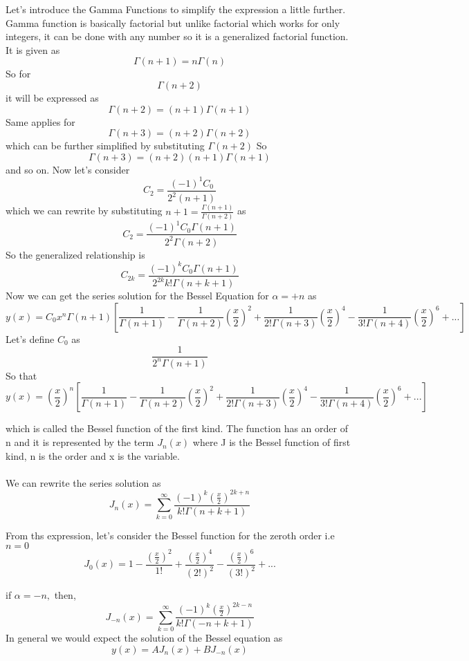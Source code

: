	Let's introduce the Gamma Functions to simplify the expression a little further. Gamma function is basically factorial but unlike factorial which works for only integers, it can be done with any number so it is a generalized factorial function. It is given as 
	$$\Gamma(n + 1) = n \Gamma(n)$$
	So for $$\Gamma(n + 2)$$ it will be expressed as $$\Gamma(n + 2) = (n + 1)\Gamma(n + 1)$$
	Same applies for $$\Gamma(n + 3) = (n + 2)\Gamma(n + 2)$$ which can be further simplified by substituting $\Gamma(n + 2)$
	So   $$\Gamma(n + 3) = (n + 2)(n + 1)\Gamma(n + 1)$$ and so on.
	Now let's consider
	$$C_2 = \frac{(-1)^1 C_0}{2^2(n + 1)}$$
	which we can rewrite by substituting $ n + 1 = \frac{\Gamma(n + 1)}{\Gamma(n + 2)}$ as 
	$$C_2 = \frac{(-1)^1 C_0 \Gamma(n + 1)}{2^2 \Gamma(n + 2)}$$
	So the generalized relationship is 
	$$C_{2k} =  \frac{(-1)^k C_0 \Gamma(n + 1)}{2^{2k} k! \Gamma(n + k + 1)}$$
	Now we can get the series solution for the Bessel Equation for $\alpha= +n$ as 
	\begin{dmath*}
		y(x) = C_0 x^n \Gamma(n + 1) \left[\frac{1}{\Gamma(n + 1)} - \frac{1}{\Gamma(n+2)}\left(\frac{x}{2}\right)^2 +\frac{1}{2!\Gamma(n+3)}\left(\frac{x}{2}\right)^4 - \frac{1}{3!\Gamma(n+4)}\left(\frac{x}{2}\right)^6 + ... \right]
	\end{dmath*}
	Let's define $C_0$ as $$\frac{1}{2^n \Gamma(n + 1)}$$ So that
	\begin{dmath*}
		y(x) = (\frac{x}{2})^n \left[\frac{1}{\Gamma(n + 1)} - \frac{1}{\Gamma(n+2)}\left(\frac{x}{2}\right)^2 +\frac{1}{2!\Gamma(n+3)}\left(\frac{x}{2}\right)^4 - \frac{1}{3!\Gamma(n+4)}\left(\frac{x}{2}\right)^6 + ... \right]
	\end{dmath*}
	
	which is called the Bessel function of the first kind. The function has an order of n and it is represented by the term $J_n(x)$
	where J is the Bessel function of first kind, n is the order and x is the variable.
		\\\\
	We can rewrite the series solution as 
	$$J_n(x) = \sum_{k = 0}^{\infty}\frac{(-1)^k (\frac{x}{2})^{2k + n}}{k! \Gamma(n + k + 1)}$$
	
	From ths expression, let's consider the Bessel function for the zeroth order i.e $n=0$
	$$J_0(x) = 1 - \frac{(\frac{x}{2})^2 }{1!} + \frac{(\frac{x}{2})^4 }{(2!)^2} - \frac{(\frac{x}{2})^6 }{(3!)^2} + ...$$
	
	if $\alpha = -n,$ then,
	\begin{equation}
		J_{-n}(x) = \sum_{k = 0}^{\infty}\frac{(-1)^k (\frac{x}{2})^{2k - n}}{k! \Gamma(-n + k + 1)}
		\label{eqn2}
	\end{equation}
	In general we would expect the solution of the Bessel equation as $$ y(x) = A J_n(x) + B J_{-n} (x)$$
	
